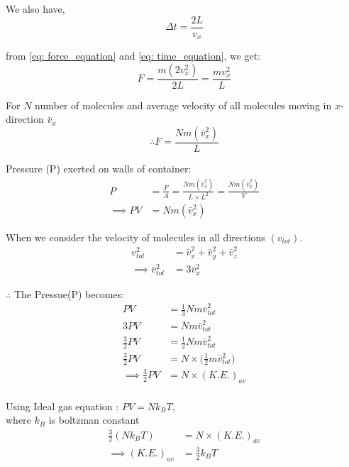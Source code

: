 \documentclass[fleqn,10pt]{SelfArx} %
\begin{document}
We also have,
\begin{equation}
    \Delta t = \frac{2L}{v_x}
    \label{eq: time_equation}
\end{equation}

from \cref{eq: force_equation} and \cref{eq: time_equation}, we get:
\begin{equation}
    F = \frac{m (2v_x^2)}{2L} = \frac{m v_x^2}{L}
\end{equation}

For $N$ number of molecules and average velocity of all molecules moving in $x$-direction $\bar{v}_x$
\begin{equation}
    \therefore F = \frac{Nm (\bar{v}_x^2)}{L}
\end{equation}

Pressure (P) exerted on walls of container:
\begin{align}
    P &= \frac{F}{A} = \frac{Nm (\bar{v}_x^2)}{L \times L^2} = \frac{Nm (\bar{v}_x^2)}{V} \\
    \implies  PV &=  Nm (\bar{v}_x^2)
\end{align}

When we consider  the velocity of molecules in all directions $(v_{tot})$.
\begin{align}
    v_{tot}^2 &= \bar{v}_x^2 + \bar{v}_y^2 + \bar{v}_z^2 \\
    \implies \bar{v}_{tot}^2 &= 3\bar{v}_x^2
\end{align}

$\therefore$ The Pressue(P) becomes:
\begin{align}
    PV &= \frac{1}{3} Nm \bar{v}_{tot}^2 \\
    3PV &= Nm \bar{v}_{tot}^2 \\
    \frac{3}{2} PV &= \frac{1}{2} Nm \bar{v}_{tot}^2 \\
    \frac{3}{2} PV &= N \times \Big(\frac{1}{2}m\bar{v}_{tot}^2 \Big)\\ 
    \implies \frac{3}{2} PV &= N \times(K.E.)_{av}\\ 
\end{align}

Using Ideal gas equation : $PV=Nk_BT$,\\ where $k_B$ is boltzman constant 
\begin{align}
   \frac{3}{2} (Nk_BT) &= N \times(K.E.)_{av}\\ 
   \implies (K.E.)_{av}&= \frac{3}{2} k_BT
\end{align}
\end{document}

